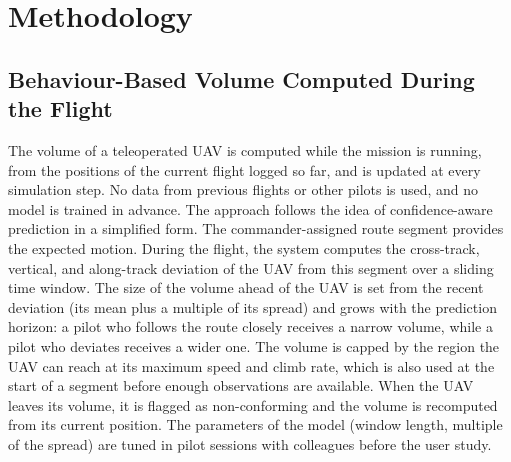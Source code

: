 \documentclass{article}
\begin{document}

\section{Methodology}

\subsection{Behaviour-Based Volume Computed During the Flight}
The volume of a teleoperated UAV is computed while the mission is running, from the positions of the current flight logged so far, and is updated at every simulation step.
No data from previous flights or other pilots is used, and no model is trained in advance.
The approach follows the idea of confidence-aware prediction \cite{fisac2018confidence} in a simplified form.
The commander-assigned route segment provides the expected motion.
During the flight, the system computes the cross-track, vertical, and along-track deviation of the UAV from this segment over a sliding time window.
The size of the volume ahead of the UAV is set from the recent deviation (its mean plus a multiple of its spread) and grows with the prediction horizon: a pilot who follows the route closely receives a narrow volume, while a pilot who deviates receives a wider one.
The volume is capped by the region the UAV can reach at its maximum speed and climb rate, which is also used at the start of a segment before enough observations are available.
When the UAV leaves its volume, it is flagged as non-conforming and the volume is recomputed from its current position.
The parameters of the model (window length, multiple of the spread) are tuned in pilot sessions with colleagues before the user study.
\end{document}
